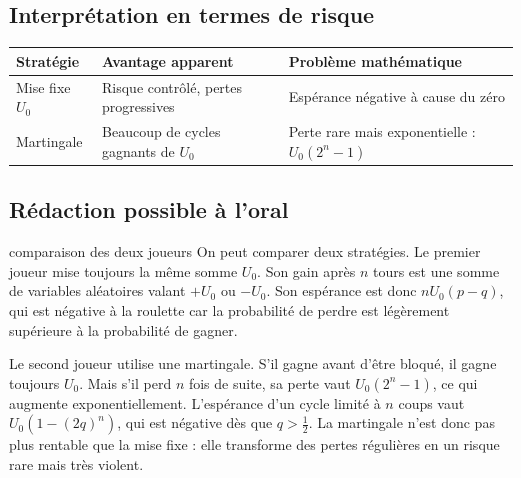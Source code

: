 \documentclass[11pt,a4paper]{article}
\begin{document}
\subsection{Interprétation en termes de risque}

\begin{center}
\renewcommand{\arraystretch}{1.5}
\begin{tabular}{p{4cm}p{5cm}p{5cm}}
\toprule
\textbf{Stratégie} & \textbf{Avantage apparent} & \textbf{Problème mathématique} \\
\midrule
Mise fixe \(U_0\) & Risque contrôlé, pertes progressives & Espérance négative à cause du zéro \\
\midrule
Martingale & Beaucoup de cycles gagnants de \(U_0\) & Perte rare mais exponentielle : \(U_0(2^n-1)\) \\
\bottomrule
\end{tabular}
\end{center}

\subsection{Rédaction possible à l'oral}

\begin{oral}{comparaison des deux joueurs}
On peut comparer deux stratégies. Le premier joueur mise toujours la même somme \(U_0\). Son gain après \(n\) tours est une somme de variables aléatoires valant \(+U_0\) ou \(-U_0\). Son espérance est donc \(nU_0(p-q)\), qui est négative à la roulette car la probabilité de perdre est légèrement supérieure à la probabilité de gagner.

Le second joueur utilise une martingale. S'il gagne avant d'être bloqué, il gagne toujours \(U_0\). Mais s'il perd \(n\) fois de suite, sa perte vaut \(U_0(2^n-1)\), ce qui augmente exponentiellement. L'espérance d'un cycle limité à \(n\) coups vaut \(U_0(1-(2q)^n)\), qui est négative dès que \(q>\frac12\). La martingale n'est donc pas plus rentable que la mise fixe : elle transforme des pertes régulières en un risque rare mais très violent.
\end{oral}
\end{document}
